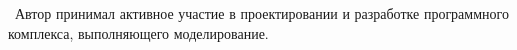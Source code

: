 






\contribution\ Автор принимал активное участие в проектировании и разработке программного комплекса, выполняющего моделирование.


    

